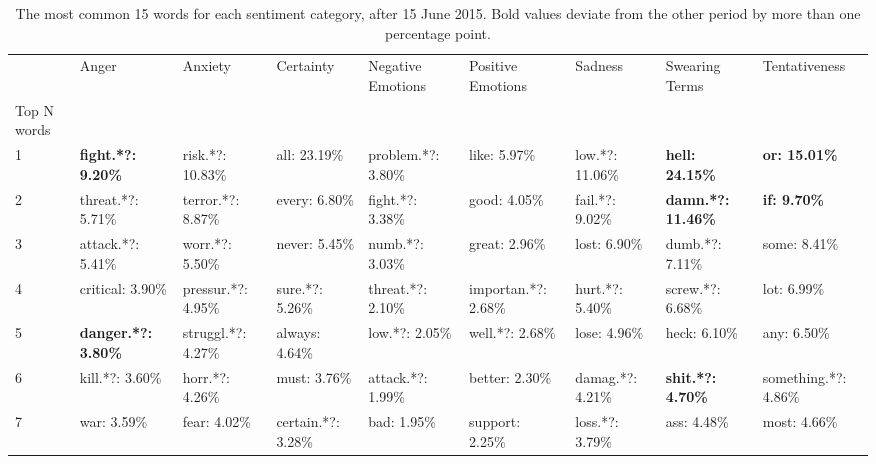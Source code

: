 \begin{table}[h]\centering
\caption{The most common 15 words for each sentiment category, after 15 June 2015. Bold values deviate from the other period by more than one percentage point.}
	\label{fig: after_1}
\begin{adjustbox}{width=\linewidth, center}
	\begin{tabular}{lllllllll}
	\toprule
	{} &                       Anger &               Anxiety &              Certainty &     Negative Emotions &    Positive Emotions &                Sadness &             Swearing Terms &         Tentativeness \\
	Top N words          &                             &                       &                        &                       &                      &                        &                            &                       \\
	\midrule
	1                    &   \textbf{fight.*?: 9.20\%} &      risk.*?: 10.83\% &           all: 23.19\% &    problem.*?: 3.80\% &         like: 5.97\% &        low.*?: 11.06\% &     \textbf{hell: 24.15\%} &  \textbf{or: 15.01\%} \\
	2                    &           threat.*?: 5.71\% &     terror.*?: 8.87\% &          every: 6.80\% &      fight.*?: 3.38\% &         good: 4.05\% &        fail.*?: 9.02\% &  \textbf{damn.*?: 11.46\%} &   \textbf{if: 9.70\%} \\
	3                    &           attack.*?: 5.41\% &       worr.*?: 5.50\% &          never: 5.45\% &       numb.*?: 3.03\% &        great: 2.96\% &           lost: 6.90\% &            dumb.*?: 7.11\% &          some: 8.41\% \\
	4                    &            critical: 3.90\% &    pressur.*?: 4.95\% &        sure.*?: 5.26\% &     threat.*?: 2.10\% &  importan.*?: 2.68\% &        hurt.*?: 5.40\% &           screw.*?: 6.68\% &           lot: 6.99\% \\
	5                    &  \textbf{danger.*?: 3.80\%} &    struggl.*?: 4.27\% &         always: 4.64\% &        low.*?: 2.05\% &      well.*?: 2.68\% &           lose: 4.96\% &               heck: 6.10\% &           any: 6.50\% \\
	6                    &             kill.*?: 3.60\% &       horr.*?: 4.26\% &           must: 3.76\% &     attack.*?: 1.99\% &       better: 2.30\% &       damag.*?: 4.21\% &   \textbf{shit.*?: 4.70\%} &  something.*?: 4.86\% \\
	7                    &                 war: 3.59\% &          fear: 4.02\% &     certain.*?: 3.28\% &           bad: 1.95\% &      support: 2.25\% &        loss.*?: 3.79\% &                ass: 4.48\% &          most: 4.66\% \\

\end{tabular}
\end{adjustbox}
\end{table}
